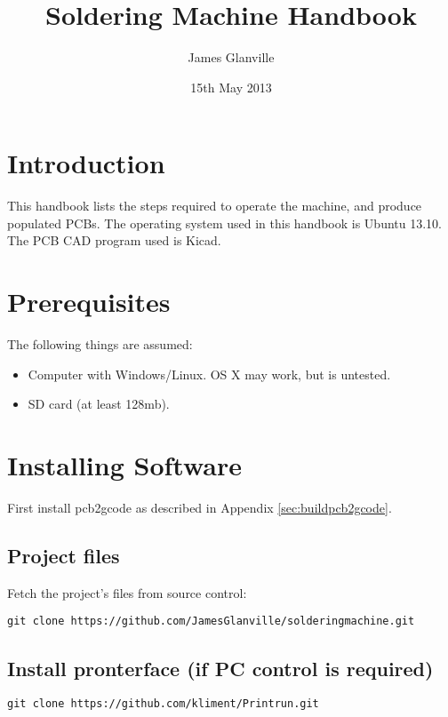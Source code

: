 \documentclass[a4paper,11pt]{article}  %
\title{Soldering Machine Handbook}
\author{James Glanville}
\date{15th May 2013}
\begin{document}
\maketitle

\tableofcontents

\newpage

\section{Introduction}

This handbook lists the steps required to operate the machine, and
produce populated PCBs. The operating system used in this handbook is
Ubuntu 13.10. The PCB CAD program used is Kicad.

\section{Prerequisites}
The following things are assumed:

\begin{itemize}
	\item	Computer with Windows/Linux. OS X may work, but is untested.
	\item	SD card (at least 128mb).
\end{itemize}

\section{Installing Software}
First install pcb2gcode as described in Appendix \ref{sec:buildpcb2gcode}.


\subsection{Project files}
Fetch the project's files from source control:
\begin{lstlisting}[frame=single,breaklines=true]
git clone https://github.com/JamesGlanville/solderingmachine.git
\end{lstlisting}

\subsection{Install pronterface (if PC control is required)}
\begin{lstlisting}[frame=single,breaklines=true]
git clone https://github.com/kliment/Printrun.git
\end{lstlisting}
\end{document}
